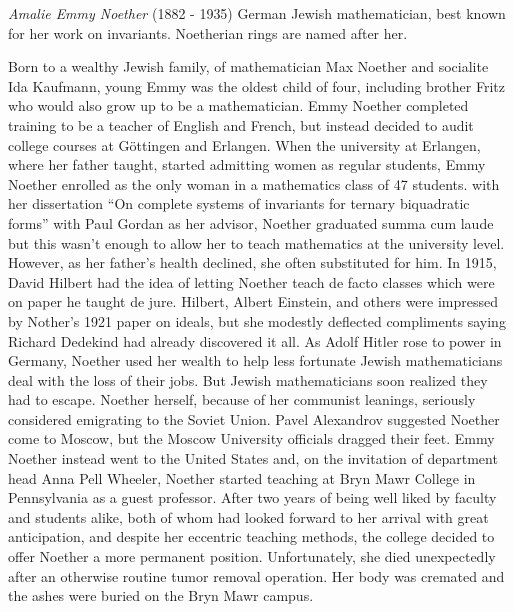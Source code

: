 \documentclass[12pt]{article}
\begin{document}

\emph{Amalie Emmy Noether} (1882 - 1935) German Jewish mathematician, best known for her work on invariants. Noetherian rings are named after her.

Born to a wealthy Jewish family, of mathematician Max Noether and socialite Ida Kaufmann, young Emmy was the oldest child of four, including brother Fritz who would also grow up to be a mathematician. Emmy Noether completed training to be a teacher of English and French, but instead decided to audit college courses at G\"ottingen and Erlangen. When the university at Erlangen, where her father taught, started admitting women as regular students, Emmy Noether enrolled as the only woman in a mathematics class of 47 students. with her dissertation ``On complete systems of invariants for ternary biquadratic forms'' with Paul Gordan as her advisor, Noether graduated summa cum laude but this wasn't enough to allow her to teach mathematics at the university level. However, as her father's health declined, she often substituted for him. In 1915, David Hilbert had the idea of letting Noether teach de facto classes which were on paper he taught de jure. Hilbert, Albert Einstein, and others were impressed by Nother's 1921 paper on ideals, but she modestly deflected compliments saying Richard Dedekind had already discovered it all. As Adolf Hitler rose to power in Germany, Noether used her wealth to help less fortunate Jewish mathematicians deal with the loss of their jobs. But Jewish mathematicians soon realized they had to escape. Noether herself, because of her communist leanings, seriously considered emigrating to the Soviet Union. Pavel Alexandrov suggested Noether come to Moscow, but the Moscow University officials dragged their feet. Emmy Noether instead went to the United States and, on the invitation of department head Anna Pell Wheeler, Noether started teaching at Bryn Mawr College in Pennsylvania as a guest professor. After two years of being well liked by faculty and students alike, both of whom had looked forward to her arrival with great anticipation, and despite her eccentric teaching methods, the college decided to offer Noether a more permanent position. Unfortunately, she died unexpectedly after an otherwise routine tumor removal operation. Her body was cremated and the ashes were buried on the Bryn Mawr campus.
\end{document}
